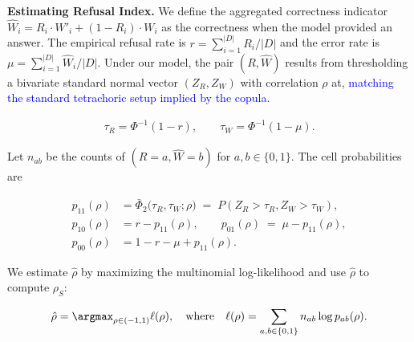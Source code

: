 \documentclass{article} %
\theoremstyle{definition}
\newcommand{\wigglyblue}[1]{\textcolor{blue}{#1}}
\begin{document}
\noindent\textbf{Estimating Refusal Index.} We define the aggregated correctness indicator $\hat{W}_i = R_i \cdot W'_i + (1-R_i) \cdot W_i$ as the correctness when the model provided an answer. 
The empirical refusal rate is $r=\sum_{i=1}^{|D|} R_i/|D|$ and the error rate is $\mu = \sum_{i=1}^{|D|} \hat{W}_i/|D|$. 
Under our model, the pair $(R,\hat{W})$ results from thresholding a bivariate standard normal vector $(Z_R,Z_W)$ with correlation $\rho$ at, \wigglyblue{matching the standard tetrachoric setup implied by the copula}.


\vspace{-1em}
\begin{equation}
    \begin{aligned}
        \tau_R=\Phi^{-1}(1-r), \qquad \tau_W=\Phi^{-1}(1-\mu).
    \end{aligned}
\end{equation}
\vspace{-1.5em}

Let $n_{ab}$ be the counts of $(R=a, \hat{W}=b)$ for $a,b\in\{0,1\}$. The cell probabilities are

\vspace{-1em}
\begin{equation}
    \begin{aligned}
    p_{11}(\rho) &= \bar\Phi_2\!\big(\tau_R,\tau_W;\rho\big) \;=\; P(Z_R>\tau_R, Z_W>\tau_W),\\
    p_{10}(\rho) &= r - p_{11}(\rho),\qquad
    p_{01}(\rho) \;=\; \mu - p_{11}(\rho),\\
    p_{00}(\rho) &= 1 - r - \mu + p_{11}(\rho).
    \end{aligned}
\end{equation}
\vspace{-1em}

We estimate $\hat\rho$ by maximizing the multinomial log-likelihood and use $\hat\rho$ to compute $\rho_S$:

\vspace{-1em}
\begin{equation}
    \begin{aligned}
        \hat\rho = \argmax_{\rho \in (-1,1)} \ell(\rho), \quad \text{where} \quad \ell(\rho) = \sum_{a,b\in\{0,1\}} n_{ab} \log p_{ab}(\rho).
        \label{eq:ri-estimation}
    \end{aligned}
\end{equation}

\vspace{-0.7em}
\end{document}
